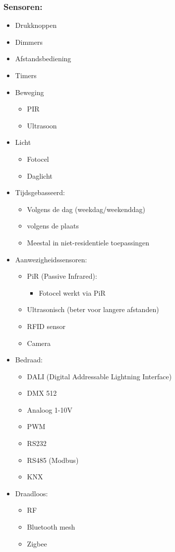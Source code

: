\documentclass[12pt]{article}
\begin{document}
\subsubsection{Sensoren:}\begin{itemize}
    \item Drukknoppen 
    \item Dimmers 
    \item Afstandsbediening 
    \item Timers 
    \item Beweging\begin{itemize}
        \item PIR 
        \item Ultrasoon 
    \end{itemize}
    \item Licht\begin{itemize}
        \item Fotocel
        \item Daglicht
    \end{itemize}
    \item Tijdsgebasseerd:\begin{itemize}
        \item Volgens de dag (weekdag/weekenddag)
        \item volgens de plaats 
        \item Meestal in niet-residentiele toepassingen
    \end{itemize}
    \item Aanwezigheidssensoren:\begin{itemize}
        \item PiR (Passive Infrared):\begin{itemize}
            \item Fotocel werkt via PiR
        \end{itemize}
        \item Ultrasonisch (beter voor langere afstanden)
        \item RFID sensor 
        \item Camera
    \end{itemize}
    \item Bedraad:\begin{itemize}
        \item DALI (Digital Addressable Lightning Interface)
        \item DMX 512
        \item Analoog 1-10V
        \item PWM
        \item RS232
        \item RS485 (Modbus)
        \item KNX
    \end{itemize}
    \item Draadloos:\begin{itemize}
        \item RF
        \item Bluetooth mesh
        \item Zigbee
    \end{itemize}
\end{itemize}
\end{document}
